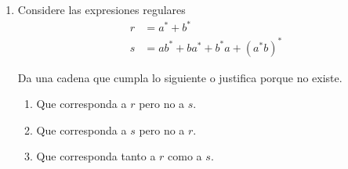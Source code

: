 \documentclass{article}
\begin{document}
\begin{enumerate}
{        }
        \item {
            Considere las expresiones regulares
            \begin{align*}
                r &= a^* + b^* \\
                s &= ab^* + ba^* + b^*a + (a^*b)^*
            \end{align*}
            
            Da una cadena que cumpla lo siguiente o justifica porque no existe.
            \begin{enumerate}
                \item {
                    Que corresponda a $r$ pero no a $s$.
                }
                \item {
                    Que corresponda a $s$ pero no a $r$.
                }
                \item {
                    Que corresponda tanto a $r$ como a $s$.
                }
            \end{enumerate}
        }
    \end{enumerate}
\end{document}
